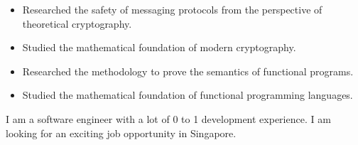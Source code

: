 \documentclass[10pt,a4paper,ragged2e,withhyper]{altacv}
\begin{document}
\begin{paracol}{2}


\begin{itemize}
  \item Researched the safety of messaging protocols from the perspective of theoretical cryptography.
  \item Studied the mathematical foundation of modern cryptography.
\end{itemize}

\divider

\begin{itemize}
  \item Researched the methodology to prove the semantics of functional programs.
  \item Studied the mathematical foundation of functional programming languages.
\end{itemize}

\medskip



\switchcolumn





I am a software engineer with a lot of 0 to 1 development experience.
I am looking for an exciting job opportunity in Singapore.





\end{paracol}
\end{document}
